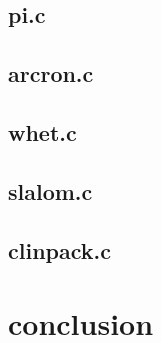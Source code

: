 \documentclass[10pt,a4paper]{article}
\begin{document}
\subsection*{pi.c}

\subsection*{arcron.c}

\subsection*{whet.c}

\subsection*{slalom.c}

\subsection*{clinpack.c}

\section{conclusion}
\end{document}
